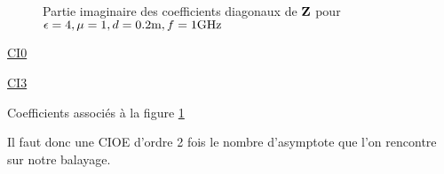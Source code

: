      \begin{figure}[!hbt]
          \centering
          
          \caption[CIOE sur empilement avec triple asymptote]{Partie imaginaire des coefficients diagonaux de \(\mathbf{Z}\) pour \(\epsilon = 4, \mu = 1, d=0.2\text{m}, f=1\text{GHz}\)}
          \label{fig:imp_fourier:plan:triple_asymptote:hoibc}
      \end{figure}
      \begin{table}[!hbt]
        \centering
        \begin{minipage}[t]{0.49\textwidth}
        \vspace{0pt}
        \centering
        \begin{coefftable}{\hyperlink{ci0}{CI0}}
          
        \end{coefftable}

        \begin{coefftable}{\hyperlink{ci3}{CI3}}
          
        \end{coefftable}
        \end{minipage}
        \caption{Coefficients associés à la figure \ref{fig:imp_fourier:plan:triple_asymptote:hoibc}}
        \label{tab:imp_fourier:plan:triple_asymptote:hoibc}
      \end{table}
      Il faut donc une CIOE d'ordre 2 fois le nombre d'asymptote que l'on rencontre sur notre balayage.